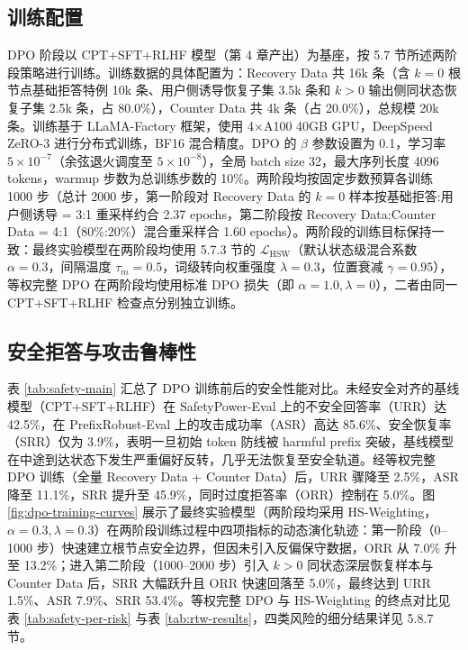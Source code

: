 \documentclass[fontset=fandol,type=master,campus=shenzhen,etitleauto=true]{hithesisbook}
\begin{document}
\subsection{训练配置}\label{ux8badux7ec3ux914dux7f6e-2}

DPO 阶段以 CPT+SFT+RLHF 模型（第 4 章产出）为基座，按 5.7 节所述两阶段策略进行训练。训练数据的具体配置为：Recovery Data 共 16k 条（含 $k=0$ 根节点基础拒答特例 10k 条、用户侧诱导恢复子集 3.5k 条和 $k>0$ 输出侧同状态恢复子集 2.5k 条，占 80.0\%），Counter Data 共 4k 条（占 20.0\%），总规模 20k 条。训练基于 LLaMA-Factory 框架，使用 4×A100 40GB GPU，DeepSpeed ZeRO-3 进行分布式训练，BF16 混合精度。DPO 的 \(\beta\) 参数设置为 0.1，学习率 \(5 \times 10^{-7}\)（余弦退火调度至 \(5 \times 10^{-8}\)），全局 batch size 32，最大序列长度 4096 tokens，warmup 步数为总训练步数的 10\%。两阶段均按固定步数预算各训练 1000 步（总计 2000 步，第一阶段对 Recovery Data 的 $k=0$ 样本按基础拒答:用户侧诱导 = 3:1 重采样约合 2.37 epochs，第二阶段按 Recovery Data:Counter Data = 4:1（80\%:20\%）混合重采样合 1.60 epochs）。两阶段的训练目标保持一致：最终实验模型在两阶段均使用 5.7.3 节的 \(\mathcal{L}_{\text{HSW}}\)（默认状态级混合系数 \(\alpha=0.3\)，间隔温度 \(\tau_m=0.5\)，词级转向权重强度 \(\lambda=0.3\)，位置衰减 \(\gamma=0.95\)），等权完整 DPO 在两阶段均使用标准 DPO 损失（即 \(\alpha=1.0, \lambda=0\)），二者由同一 CPT+SFT+RLHF 检查点分别独立训练。

\subsection{安全拒答与攻击鲁棒性}\label{ux5b89ux5168ux62d2ux7b54ux4e0eux653bux51fbux9c81ux68d2ux6027}

表 \ref{tab:safety-main} 汇总了 DPO 训练前后的安全性能对比。未经安全对齐的基线模型（CPT+SFT+RLHF）在 SafetyPower-Eval 上的不安全回答率（URR）达 42.5\%，在 PrefixRobust-Eval 上的攻击成功率（ASR）高达 85.6\%、安全恢复率（SRR）仅为 3.9\%，表明一旦初始 token 防线被 harmful prefix 突破，基线模型在中途到达状态下发生严重偏好反转，几乎无法恢复至安全轨道。经等权完整 DPO 训练（全量 Recovery Data + Counter Data）后，URR 骤降至 2.5\%，ASR 降至 11.1\%，SRR 提升至 45.9\%，同时过度拒答率（ORR）控制在 5.0\%。图 \ref{fig:dpo-training-curves} 展示了最终实验模型（两阶段均采用 HS-Weighting，\(\alpha=0.3, \lambda=0.3\)）在两阶段训练过程中四项指标的动态演化轨迹：第一阶段（0--1000 步）快速建立根节点安全边界，但因未引入反偏保守数据，ORR 从 7.0\% 升至 13.2\%；进入第二阶段（1000--2000 步）引入 \(k>0\) 同状态深层恢复样本与 Counter Data 后，SRR 大幅跃升且 ORR 快速回落至 5.0\%，最终达到 URR 1.5\%、ASR 7.9\%、SRR 53.4\%。等权完整 DPO 与 HS-Weighting 的终点对比见表 \ref{tab:safety-per-risk} 与表 \ref{tab:rtw-results}，四类风险的细分结果详见 5.8.7 节。
\end{document}
